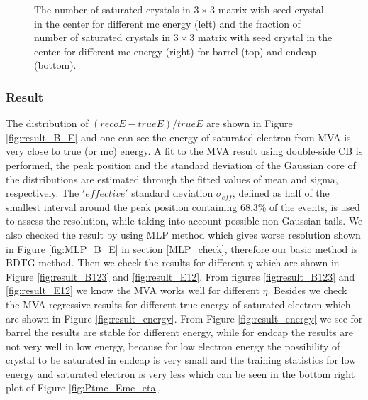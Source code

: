\begin{figure}[bh]
\begin{center}
\begin{tabular}{cc}
    \end{tabular}
    \caption{The number of saturated crystals in $3\times3$ matrix with seed crystal in the center for different mc energy (left) and the fraction of number of saturated crystals in $3\times3$ matrix with seed crystal in the center for different mc energy (right) for barrel (top) and endcap (bottom).}
    \label{fig:N_S_Emc}
  \end{center}
\end{figure}

\subsubsection{Result}

The distribution of $(reco E - true E)/true E$ are shown in Figure \ref{fig:result_B_E} and one can see the energy of saturated electron from MVA is very close to true (or mc) energy. A fit to the MVA result using double-side CB is performed, the peak position and the standard deviation of the Gaussian core of the distributions are estimated through the fitted values of mean and sigma, respectively. The $'effective'$ standard deviation $\sigma_{eff}$, defined as half of the smallest interval around the peak position containing 68.3\% of the events, is used to assess the resolution, while taking into account possible non-Gaussian tails. We also checked the result by using MLP method which gives worse resolution shown in Figure \ref{fig:MLP_B_E} in section \ref{MLP_check}, therefore our basic method is BDTG method. Then we check the results for different $\eta$ which are shown in Figure \ref{fig:result_B123} and \ref{fig:result_E12}. From figures \ref{fig:result_B123} and \ref{fig:result_E12} we know the MVA works well for different $\eta$. Besides we check the MVA regressive results for different true energy of saturated electron which are shown in Figure \ref{fig:result_energy}. From Figure \ref{fig:result_energy} we see for barrel the results are stable for different energy, while for endcap the results are not very well in low energy, because for low electron energy the possibility of crystal to be saturated in endcap is very small and the training statistics for low energy and saturated electron is very less which can be seen in the bottom right plot of Figure \ref{fig:Ptmc_Emc_eta}.

